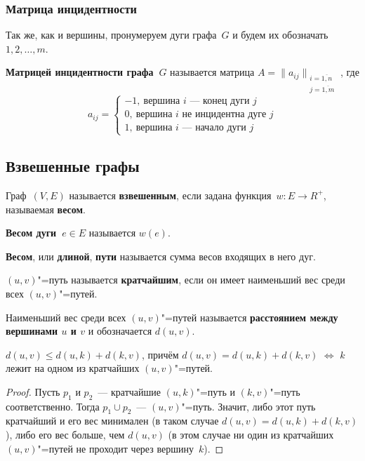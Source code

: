 \subsubsection{Матрица инцидентности}
Так же, как и вершины, пронумеруем дуги графа~$G$ и будем их обозначать $1, 2, \ldots, m$.

 \textbf{Матрицей инцидентности графа~$G$} называется матрица $A = \|a_{ij}\|_{\begin{smallmatrix}
i = \overline{1,n} \\
j = \overline{1,m}
\end{smallmatrix}}$, где
\begin{equation*}
a_{ij} =
\begin{cases}
-1, \ \text{вершина~$i$~--- конец дуги~$j$} \\
0, \ \text{вершина~$i$ не инцидентна дуге~$j$} \\
1, \ \text{вершина~$i$~--- начало дуги~$j$}
\end{cases}
\end{equation*}

\subsection{Взвешенные графы}
Граф~$(V, E)$ называется \textbf{взвешенным}, если задана функция~$w \colon E \to R^+$, называемая \textbf{весом}.

\textbf{Весом дуги~$e \in E$} называется $w(e)$.

\textbf{Весом}, или \textbf{длиной}, \textbf{пути} называется сумма весов входящих в него дуг.

$(u, v)$"=путь называется \textbf{кратчайшим}, если он имеет наименьший вес среди всех $(u, v)$"=путей.

Наименьший вес среди всех $(u, v)$"=путей называется \textbf{расстоянием между вершинами $u$ и $v$} и обозначается $d(u, v)$.

\begin{statement}
$d(u, v) \leqslant d(u, k) + d(k, v)$, причём $d(u, v) = d(u, k) + d(k, v)$ $\Leftrightarrow$ $k$ лежит на одном из кратчайших $(u, v)$"=путей.
\end{statement}
\begin{proof}
Пусть $p_1$ и $p_2$~--- кратчайшие $(u, k)$"=путь и $(k, v)$"=путь соответственно.
Тогда $p_1 \cup p_2$~--- $(u, v)$"=путь.
Значит, либо этот путь кратчайший и его вес минимален (в таком случае $d(u, v) = d(u, k) + d(k, v)$), либо его вес больше, чем $d(u, v)$ (в этом случае ни один из кратчайших $(u, v)$"=путей не проходит через вершину~$k$).
\end{proof}

